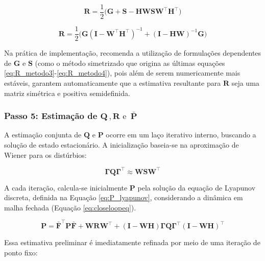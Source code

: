 \documentclass[journal]{IEEEtran}
\begin{document}
\begin{equation}
    \label{eq:R_metodo3}
    \mathbf{R} = \frac{1}{2}\big(\mathbf{G} + \mathbf{S} - \mathbf{H}\mathbf{W}\mathbf{S}\mathbf{W}^\top\mathbf{H}^\top\big)
\end{equation}

\begin{equation}
    \label{eq:R_metodo4}
    \mathbf{R} = \frac{1}{2}\Big(\mathbf{G}(\mathbf{I} - \mathbf{W}^\top\mathbf{H}^\top)^{-1} + (\mathbf{I} - \mathbf{H}\mathbf{W})^{-1}\mathbf{G}\Big)
\end{equation}

Na prática de implementação, \cite{zhang2020} recomenda a utilização de formulações dependentes de $\mathbf{G}$ e $\mathbf{S}$ (como o método simetrizado que origina as últimas equações \eqref{eq:R_metodo3}-\eqref{eq:R_metodo4}), pois além de serem numericamente mais estáveis, garantem automaticamente que a estimativa resultante para $\mathbf{R}$ seja uma matriz simétrica e positiva semidefinida.

\subsubsection{\textbf{Passo 5: Estimação de $\mathbf{Q}\,,\mathbf{R}\,\,\text{e}\,\,\, \mathbf{\bar{P}}$}}

A estimação conjunta de $\mathbf{Q}$ e $\mathbf{P}$ ocorre em um laço iterativo interno, buscando a solução de estado estacionário. A inicialização baseia-se na aproximação de Wiener para os distúrbios:

\begin{equation}
    \label{eq:Q_init}
    \mathbf{\Gamma}\mathbf{Q}\mathbf{\Gamma}^\top \approx \mathbf{W}\mathbf{S}\mathbf{W}^\top
\end{equation}

A cada iteração, calcula-se inicialmente $\mathbf{P}$ pela solução da equação de Lyapunov discreta, definida na Equação \eqref{eq:P_lyapunov}, considerando a dinâmica em malha fechada (Equação \eqref{eq:closeloopeq}).

\begin{equation}
    \label{eq:P_lyapunov}
    \mathbf{P} = \bar{\mathbf{F}}^\top \mathbf{P} \bar{\mathbf{F}} + \mathbf{W}\mathbf{R}\mathbf{W}^\top + (\mathbf{I}-\mathbf{W}\mathbf{H})\mathbf{\Gamma}\mathbf{Q}\mathbf{\Gamma}^\top(\mathbf{I}-\mathbf{W}\mathbf{H})^\top
\end{equation}

Essa estimativa preliminar é imediatamente refinada por meio de uma iteração de ponto fixo:
\end{document}
